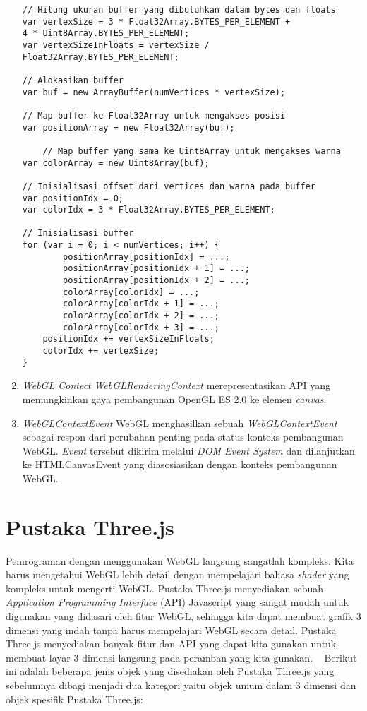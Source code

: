 \begin{enumerate}
\begin{lstlisting}[caption={Transfer data ke implementasi WebGL.}, captionpos=b]
// Hitung ukuran buffer yang dibutuhkan dalam bytes dan floats
var vertexSize = 3 * Float32Array.BYTES_PER_ELEMENT +
4 * Uint8Array.BYTES_PER_ELEMENT;
var vertexSizeInFloats = vertexSize / Float32Array.BYTES_PER_ELEMENT;

// Alokasikan buffer
var buf = new ArrayBuffer(numVertices * vertexSize);

// Map buffer ke Float32Array untuk mengakses posisi
var positionArray = new Float32Array(buf);

	// Map buffer yang sama ke Uint8Array untuk mengakses warna
var colorArray = new Uint8Array(buf);

// Inisialisasi offset dari vertices dan warna pada buffer
var positionIdx = 0;
var colorIdx = 3 * Float32Array.BYTES_PER_ELEMENT;

// Inisialisasi buffer
for (var i = 0; i < numVertices; i++) {
    	positionArray[positionIdx] = ...;
    	positionArray[positionIdx + 1] = ...;
    	positionArray[positionIdx + 2] = ...;
    	colorArray[colorIdx] = ...;
    	colorArray[colorIdx + 1] = ...;
    	colorArray[colorIdx + 2] = ...;
    	colorArray[colorIdx + 3] = ...;
   	positionIdx += vertexSizeInFloats;
   	colorIdx += vertexSize;
}
\end{lstlisting}
	
\item {\it WebGL Contect}
	{\it WebGLRenderingContext} merepresentasikan API yang memungkinkan gaya pembangunan OpenGL ES 2.0 ke elemen {\it canvas}.

\item {\it WebGLContextEvent}
	WebGL menghasilkan sebuah {\it WebGLContextEvent} sebagai respon dari perubahan penting pada status konteks pembangunan WebGL. {\it Event} tersebut dikirim melalui {\it DOM Event System} dan dilanjutkan ke HTMLCanvasEvent yang diasosiasikan dengan konteks pembangunan WebGL.

\end{enumerate}


\section{Pustaka Three.js}
\label{sec:latex}
Pemrograman dengan menggunakan WebGL langsung sangatlah kompleks. Kita harus mengetahui WebGL lebih detail dengan mempelajari bahasa {\it shader} yang kompleks untuk mengerti WebGL. Pustaka Three.js menyediakan sebuah {\it Application Programming Interface} (API) Javascript yang sangat mudah untuk digunakan yang didasari oleh fitur WebGL, sehingga kita dapat membuat grafik 3 dimensi yang indah tanpa harus mempelajari WebGL secara detail. Pustaka Three.js menyediakan banyak fitur dan API yang dapat kita gunakan untuk membuat layar 3 dimensi langsung pada peramban yang kita gunakan. ~\cite{learningThreejs}
Berikut ini adalah beberapa jenis objek yang disediakan oleh Pustaka Three.js yang sebelumnya dibagi menjadi dua kategori yaitu objek umum dalam 3 dimensi dan objek spesifik Pustaka Three.js:

